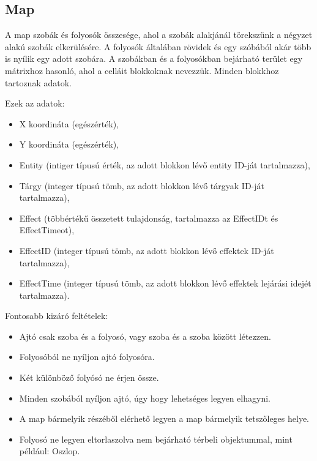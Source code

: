 \subsection{Map}

A map szobák és folyosók összesége, ahol a szobák alakjánál törekszünk a négyzet alakú szobák elkerülésére. A folyosók általában rövidek és egy szóbából akár több is nyílik egy adott szobára.
A szobákban és a folyosókban bejárható terület egy mátrixhoz hasonló, ahol a celláit blokkoknak nevezzük.
Minden blokkhoz tartoznak adatok.

\noindent Ezek az adatok:

\begin{itemize}
    \item X koordináta (egészérték),
    \item Y koordináta (egészérték),
    \item Entity (intiger típusú érték,  az adott blokkon lévő entity ID-ját tartalmazza),
    \item Tárgy (integer típusú tömb, az adott blokkon lévő tárgyak ID-ját tartalmazza),
    \item Effect (többértékű összetett tulajdonság, tartalmazza az EffectIDt és EffectTimeot),
    \item EffectID (integer típusú tömb, az adott blokkon lévő effektek ID-ját tartalmazza),
    \item EffectTime (integer típusú tömb, az adott blokkon lévő effektek lejárási idejét tartalmazza).
\end{itemize}

\noindent Fontosabb kizáró feltételek:

\begin{itemize}
    \item Ajtó csak szoba és a folyosó, vagy szoba és a szoba között létezzen.
    \item Folyosóból ne nyíljon ajtó folyosóra.
    \item Két különböző folyósó ne érjen össze.
    \item Minden szobából nyíljon ajtó, úgy hogy lehetséges legyen elhagyni.
    \item A map bármelyik részéből elérhető legyen a map bármelyik tetszőleges helye.
    \item Folyosó ne legyen eltorlaszolva nem bejárható térbeli objektummal, mint például: Oszlop.
\end{itemize}


